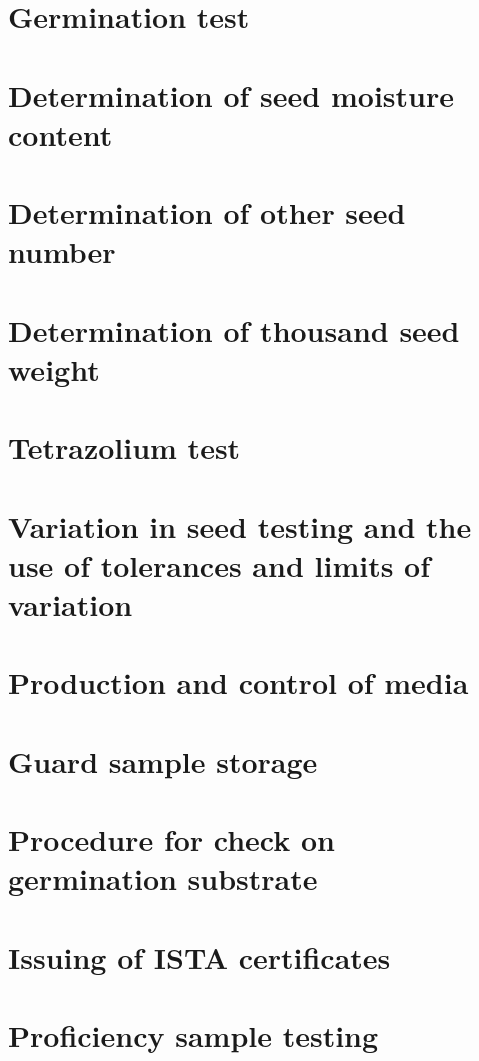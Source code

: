 \documentclass[]{book}
\begin{document}
\chapter{Germination test}\label{germination-test}

\chapter{Determination of seed moisture
content}\label{determination-of-seed-moisture-content}

\chapter{Determination of other seed
number}\label{determination-of-other-seed-number}

\chapter{Determination of thousand seed
weight}\label{determination-of-thousand-seed-weight}

\chapter{Tetrazolium test}\label{tetrazolium-test}

\chapter{Variation in seed testing and the use of tolerances and limits
of
variation}\label{variation-in-seed-testing-and-the-use-of-tolerances-and-limits-of-variation}

\chapter{Production and control of
media}\label{production-and-control-of-media}

\chapter{Guard sample storage}\label{guard-sample-storage}

\chapter{Procedure for check on germination
substrate}\label{procedure-for-check-on-germination-substrate}

\chapter{Issuing of ISTA
certificates}\label{issuing-of-ista-certificates}

\chapter{Proficiency sample testing}\label{proficiency-sample-testing}


\end{document}
